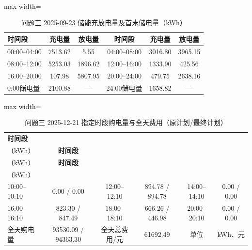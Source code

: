 \documentclass[UTF8,a4paper,zihao=-4,fontset=windows]{ctexart}
\begin{document}
\begin{table}[H]\centering
\fontsize{9.5}{12}\selectfont\setlength{\tabcolsep}{4pt}\renewcommand{\arraystretch}{1.12}
\begin{adjustbox}{max width=\linewidth}\begin{tabular}{lccccc}\toprule
\textbf{时间段} & \textbf{充电量} & \textbf{放电量} & \textbf{时间段} & \textbf{充电量} & \textbf{放电量}\\\midrule
00:00–04:00 & 7513.62 & 5.55 & 04:00–08:00 & 3016.80 & 3965.15\\
08:00–12:00 & 5253.03 & 1896.62 & 12:00–16:00 & 1333.90 & 425.56\\
16:00–20:00 & 107.98 & 5807.95 & 20:00–24:00 & 479.75 & 2638.16\\
0:00储电量 & 2100.88 & — & 24:00储电量 & 1658.82 & —\\
\bottomrule\end{tabular}\end{adjustbox}
\caption{问题三 2025-09-23 储能充放电量及首末储电量（kWh）}
\end{table}
\begin{table}[H]\centering
\fontsize{9.5}{12}\selectfont\setlength{\tabcolsep}{4pt}\renewcommand{\arraystretch}{1.12}
\begin{adjustbox}{max width=\linewidth}\begin{tabular}{lccccc}\toprule
\textbf{时间段} & \shortstack{\textbf{购电量}\\{\normalfont （kWh）}} & \textbf{时间段} & \shortstack{\textbf{购电量}\\{\normalfont （kWh）}} & \textbf{时间段} & \shortstack{\textbf{购电量}\\{\normalfont （kWh）}}\\\midrule
10:00–10:10 & 0.00 / 0.00 & 12:00–12:10 & 894.78 / 894.78 & 14:00–14:10 & 0.00 / 0.00\\
16:00–16:10 & 823.30 / 847.49 & 18:00–18:10 & 666.26 / 446.98 & 20:00–20:10 & 0.00 / 0.00\\
全天购电量 & 93530.09 / 94363.30 & 全天总费用/元 & 61692.49 & 单位 & kWh、元\\
\bottomrule\end{tabular}\end{adjustbox}
\caption{问题三 2025-12-21 指定时段购电量与全天费用（原计划/最终计划）}
\end{table}
\end{document}

